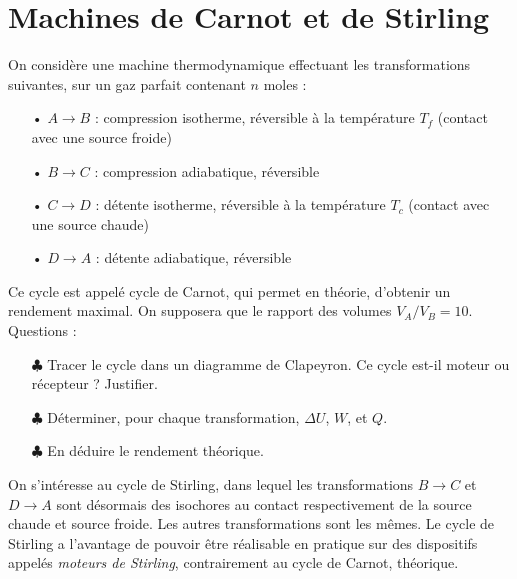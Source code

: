 \documentclass{report}
\begin{document}
\section*{Machines de Carnot et de Stirling}

On considère une machine thermodynamique effectuant les transformations suivantes, sur un gaz parfait contenant $n$ moles : 

\begin{itemize}
\item[•]$A \rightarrow B$ : compression isotherme, réversible à la température $T_f$ (contact avec une source froide)
\item[•]$B \rightarrow C$ : compression adiabatique, réversible
\item[•]$C \rightarrow D$ : détente isotherme, réversible à la température $T_c$ (contact avec une source chaude)
\item[•]$D \rightarrow A$ : détente adiabatique, réversible

\end{itemize}

Ce cycle est appelé cycle de Carnot, qui permet en théorie, d'obtenir un rendement maximal. On supposera que le rapport des volumes $V_A/V_B=10$. Questions : 

\begin{itemize}

	\item[$\clubsuit$] Tracer le cycle dans un diagramme de Clapeyron. Ce cycle est-il moteur ou récepteur ? Justifier. 

	\item[$\clubsuit$] Déterminer, pour chaque transformation, $\Delta U$, $W$, et $Q$. 
	
	\item[$\clubsuit$] En déduire le rendement théorique.
	
\end{itemize}

On s'intéresse au cycle de Stirling, dans lequel les transformations $B \rightarrow C$ et $D \rightarrow A$ sont désormais des isochores au contact respectivement de la source chaude et source froide. Les autres transformations sont les mêmes. Le cycle de Stirling a l'avantage de pouvoir être réalisable en pratique sur des dispositifs appelés \textit{moteurs de Stirling}, contrairement au cycle de Carnot, théorique.
\end{document}
